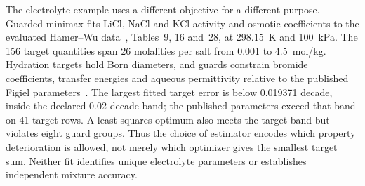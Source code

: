 The electrolyte example uses a different objective for a different purpose.
Guarded minimax fits LiCl, NaCl and KCl activity and osmotic coefficients to the evaluated Hamer--Wu data~\citep{HamerWu1972}, Tables~9, 16 and~28, at 298.15~K and 100~kPa.
The 156 target quantities span 26 molalities per salt from 0.001 to 4.5~mol/kg.
Hydration targets hold Born diameters, and guards constrain bromide coefficients, transfer energies and aqueous permittivity relative to the published Figiel parameters~\citep{Figiel2025}.
The largest fitted target error is below 0.019371 decade, inside the declared 0.02-decade band; the published parameters exceed that band on 41 target rows.
A least-squares optimum also meets the target band but violates eight guard groups.
Thus the choice of estimator encodes which property deterioration is allowed, not merely which optimizer gives the smallest target sum.
Neither fit identifies unique electrolyte parameters or establishes independent mixture accuracy.
